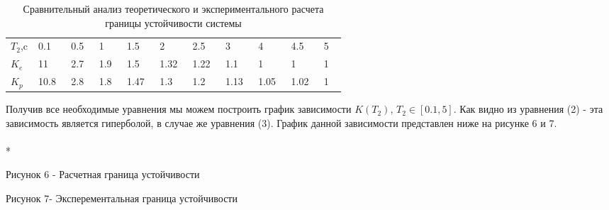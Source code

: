 \documentclass[a4paper, 12pt]{article}
\begin{document}
\begin{table}[h]
		\caption{ Сравнительный анализ теоретического и экспериментального расчета границы устойчивости системы}
		
        \begin{center}
        
        
		\begin{tabular}{|p{0.05\linewidth}|p{0.05\linewidth}|p{0.05\linewidth}|p{0.05\linewidth}|p{0.05\linewidth}|p{0.05\linewidth}|p{0.05\linewidth}|p{0.05\linewidth}|p{0.05\linewidth}|p{0.05\linewidth}|p{0.05\linewidth}|}
			\hline
			\rule{0cm}{0.5cm}
			$T_2$,c & 0.1 & 0.5 & 1 & 1.5 & 2 & 2.5 & 3 & 4 & 4.5 & 5\tabularnewline	
			\cline{1-11}
			$K_e$ & 11 & 2.7 & 1.9 & 1.5 & 1.32 & 1.22 & 1.1 & 1 & 1 & 1\\
			\cline{1-11}
		    $K_p$ & 10.8 & 2.8 & 1.8 & 1.47 & 1.3 & 1.2 & 1.13 & 1.05 & 1.02 &1 \\
				\hline
			
		\end{tabular}
\end{center}
\end{table}

	Получив все необходимые уравнения мы можем построить график зависимости $K(T_2)$, $T_2 \in [0.1, 5]$. Как видно из уравнения (2) - эта зависимость является гиперболой, в случае же уравнения (3). График данной зависимости представлен ниже на рисунке 6 и 7. \\
	\hfill\\*


\begin{center}
\end{center}
\begin{center}
 \centering Рисунок 6 - Расчетная граница устойчивости
\end{center}
\begin{center}
\end{center} 
\begin{center}
 Рисунок 7- Эксперементальная  граница устойчивости 
\end{center}
\newpage
\end{document}
